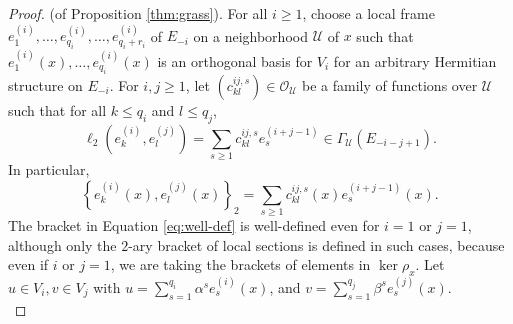 \documentclass[10pt]{article}
\theoremstyle{plain}
\theoremstyle{definition}
\theoremstyle{remark}
\begin{document}
\begin{proof}{(of Proposition \ref{thm:grass}).} For all $i\geq 1$, 
choose a local frame $e_1^{(i)},\ldots,e_{q_i}^{(i)},\ldots ,e_{q_i+r_i}^{(i)}$ of $E_{-i}$ on a neighborhood $\mathcal{U}$ of $x$ such that $e_1^{(i)}(x),\ldots,e_{q_i}^{(i)}(x)$ is an orthogonal basis for $V_{i}$ for an arbitrary Hermitian structure on $E_{-i}$. For $i, j\geq 1$, let $({c^{ij,s}_{kl}})\in \mathcal{O}_{\mathcal{U}}$ be a family of functions over $\mathcal{U}$ such that for all $k\leq q_i$ and $l\leq q_j$, $$\ell_2\left(e^{(i)}_{k}, e_{l}^{(j)}\right)=\sum_{s\geq 1}c_{kl}^{i j,s}e_s^{(i +j-1)}\in \Gamma_\mathcal{U}(E_{-i-j+1}).$$  In particular, \begin{equation}\label{eq:well-def}
    \left\{e^{(i)}_{k}(x), e_{l}^{(j)}(x)\right\}_2=\sum_{s\geq 1}c_{kl}^{ij,s}(x)e_s^{(i+j-1)}(x).
\end{equation}The bracket in Equation \ref{eq:well-def} is well-defined even for $i=1$ or $j=1$, although only the $2$-ary bracket of local sections is defined in such cases, because even if $i$ or $j=1$, we are taking the brackets of elements in $\ker\rho_x$. Let $u\in V_{i},v\in V_{j}$ with $\displaystyle{u=\sum_{s=1}^{q_{i}}\alpha^se_s^{(i)}(x)}$, and  $\displaystyle{v=\sum_{s=1}^{q_{j}}\beta^se_s^{(j)}(x)}$.\\
    

\end{proof}
\end{document}
